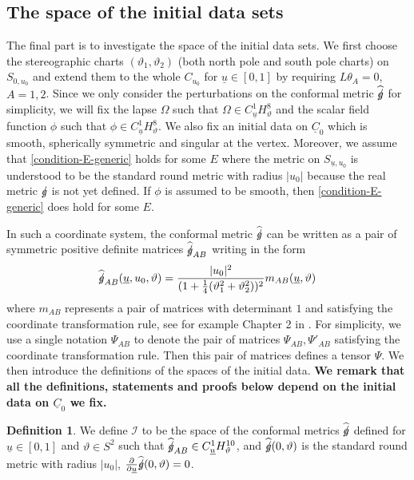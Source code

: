 \documentclass[11pt,reqno]{amsart}
\theoremstyle{definition}
\newtheorem{definition}{Definition}[section]
\numberwithin{equation}{section}
\def\ub{\underline{u}}
\def\Cb{\underline{C}}
\def\gs{\mbox{$g \mkern -9mu /$}}
\begin{document}
\subsection{The space of the initial data sets} The final part is to investigate the space of the initial data sets. We first choose the stereographic charts $(\vartheta_1,\vartheta_2)$ (both north pole and south pole charts) on $S_{0,u_0}$ and extend them to the whole $C_{u_0}$ for $\ub\in[0,1]$ by requiring $L\theta_A=0$, $A=1,2$. Since we only consider the perturbations on the conformal metric $\widehat{\gs}$ for simplicity, we will fix the lapse $\Omega$ such that $\Omega\in C^1_{\ub}H^{8}_\vartheta$ and the scalar field function $\phi$ such that $\phi\in C^1_{\ub}H^{8}_\vartheta$. We also fix an initial data on $\Cb_0$ which is smooth, spherically symmetric and singular at the vertex. Moreover, we assume that \eqref{condition-E-generic} holds for some $E$ where the metric on $S_{\ub,u_0}$ is understood to be the standard round metric with radius $|u_0|$ because the real metric $\gs$ is not yet defined. If $\phi$ is assumed to be smooth, then \eqref{condition-E-generic} does hold for some $E$.

In such a coordinate system, the conformal metric $\widehat{\gs}$ can be written as a pair of symmetric positive definite matrices $\widehat{\gs}_{AB}$ writing in the form
\begin{align}\label{conformalmetricincoordinate}
\widehat{\gs}_{AB}(\ub,u_0,\vartheta)=\frac{|u_0|^2}{(1+\frac{1}{4}(\vartheta_1^2+\vartheta_2^2))^2}m_{AB}(\ub,\vartheta)
\end{align}
where $m_{AB}$ represents a pair of matrices with determinant $1$ and satisfying the coordinate transformation rule, see for example Chapter 2 in \cite{Chr}. For simplicity, we use a single notation $\Psi_{AB}$ to denote the pair  of matrices $\Psi_{AB}, \Psi'_{AB}$ satisfying the coordinate transformation rule. Then this pair of matrices defines a tensor $\Psi$. We then introduce the definitions of the spaces of the initial data. {\bf We remark that all the definitions, statements and proofs below depend on the initial data on $\Cb_0$ we fix.}

\begin{definition}
We define $\mathcal{I}$ to be the space of the conformal metrics $\widehat{\gs}$ defined for $\ub\in[0,1]$ and $\vartheta\in S^2$ such that $\widehat{\gs}_{AB}\in C^1_{\ub}H^{10}_\vartheta$, and $\widehat{\gs}(0,\vartheta)$ is the standard round metric with radius $|u_0|$, $\frac{\partial}{\partial\ub}\widehat{\gs}(0,\vartheta)=0$.
\end{definition}
\end{document}
